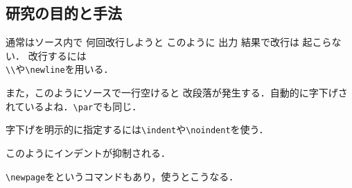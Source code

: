 \subsection{研究の目的と手法}
通常はソース内で
何回改行しようと
このように
出力
結果で改行は
起こらない．
改行するには\\
\verb+\+\verb+\+や\verb+\newline+を用いる．

また，このようにソースで一行空けると
改段落が発生する．自動的に字下げされているよね．\verb+\par+でも同じ．\par
字下げを明示的に指定するには\verb+\indent+や\verb+\noindent+を使う．

\noindent このようにインデントが抑制される．

\verb+\newpage+をというコマンドもあり，使うと{\newpage}こうなる．
